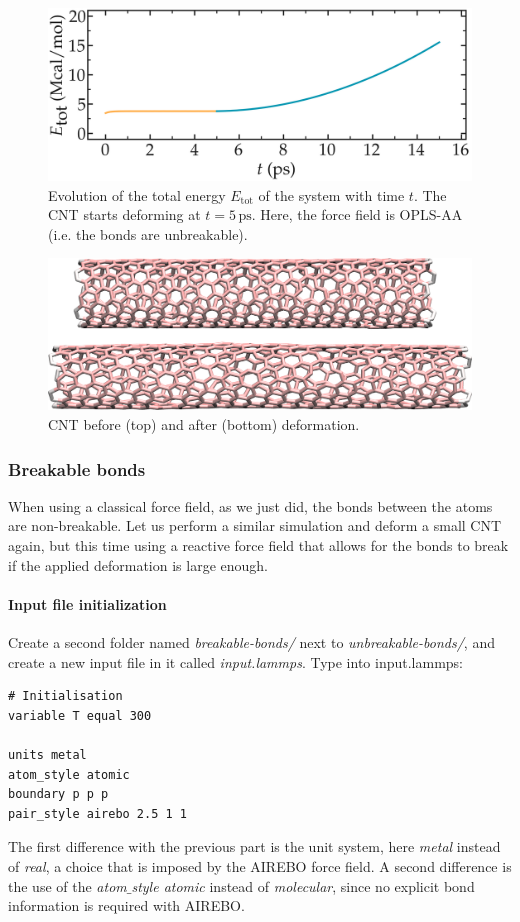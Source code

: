 \documentclass[9pt,tutorial]{livecoms}
\begin{document}
\begin{figure}
\centering
\includegraphics[width=\linewidth]{CNT-energy-unbreakable}
\caption{Evolution of the total energy $E_\text{tot}$ of the system with time $t$. The CNT starts deforming at $t = 5\,\text{ps}$. Here, the force field is OPLS-AA (i.e. the bonds are unbreakable).}
\label{fig:CNT-unbreakable-energy}
\end{figure}

\begin{figure}
\centering
\includegraphics[width=\linewidth]{CNT-deformed-unbreakable}
\caption{CNT before (top) and after (bottom) deformation.}
\label{fig:CNT-deformed-unbreakable}
\end{figure}

\subsubsection{Breakable bonds}
When using a classical force field, as we just did, the bonds between the atoms are non-breakable. Let us perform a similar simulation and deform a small CNT again, but this time using a reactive force field that allows for the bonds to break if the applied deformation is large enough.

\paragraph{Input file initialization}
\noindent Create a second folder named \textit{breakable-bonds/} next to \textit{unbreakable-bonds/}, and create a new input file in it called \textit{input.lammps}. Type into input.lammps:
{\normalsize \begin{verbatim}
# Initialisation
variable T equal 300

units metal
atom_style atomic
boundary p p p
pair_style airebo 2.5 1 1
\end{verbatim}}
The first difference with the previous part is the unit system, here \textit{metal} instead of \textit{real}, a choice that is imposed by the AIREBO force field. A second difference is the use of the \textit{atom$\_$style atomic} instead of \textit{molecular}, since no explicit bond information is required with AIREBO.
\end{document}
